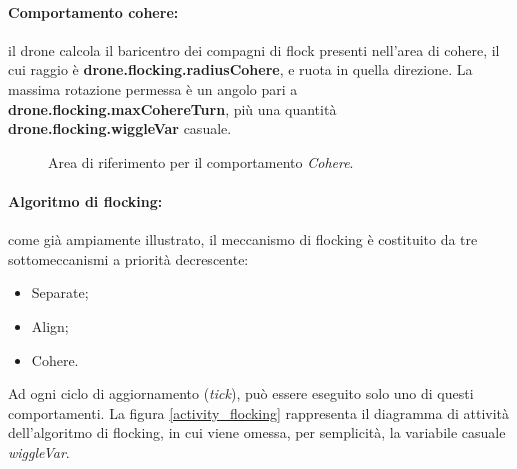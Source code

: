 \paragraph{Comportamento cohere:} il drone calcola il baricentro dei compagni di flock presenti nell'area di cohere, il cui raggio è \textbf{drone.flocking.radiusCohere}, e ruota in quella direzione.
La massima rotazione permessa è un angolo pari a \textbf{drone.flocking.maxCohereTurn}, più una quantità \textbf{drone.flocking.wiggleVar} casuale.

\begin{figure}[H] 
    \captionsetup{justification=centering, margin=2cm, font=footnotesize}
    \begin{center}
    \end{center}
    \caption{Area di riferimento per il comportamento \textit{Cohere}.}
    \label{cohere}
\end{figure}

\paragraph{Algoritmo di flocking:} come già ampiamente illustrato, il meccanismo di flocking è costituito da tre sottomeccanismi a priorità decrescente:
\begin{itemize}
    \item Separate;
    \item Align;
    \item Cohere.
\end{itemize}

Ad ogni ciclo di aggiornamento (\textit{tick}), può essere eseguito solo uno di questi comportamenti.
La figura \ref{activity_flocking} rappresenta il diagramma di attività dell'algoritmo di flocking, in cui viene omessa, per semplicità, la variabile casuale \textit{wiggleVar}.

